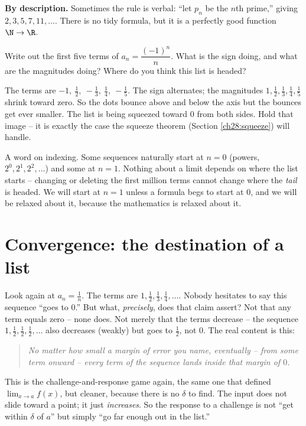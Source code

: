 \textbf{By description.} Sometimes the rule is verbal: ``let $p_n$ be the $n$th
prime,'' giving $2, 3, 5, 7, 11, \dots$. There is no tidy formula, but it is a
perfectly good function $\N \to \R$.

\begin{walkbox}
Write out the first five terms of $a_n = \dfrac{(-1)^n}{n}$. What is the sign
doing, and what are the magnitudes doing? Where do you think this list is
headed?

\smallskip
The terms are $-1,\ \tfrac12,\ -\tfrac13,\ \tfrac14,\ -\tfrac15$. The sign
alternates; the magnitudes $1, \tfrac12, \tfrac13, \tfrac14, \tfrac15$ shrink
toward zero. So the dots bounce above and below the axis but the bounces get
ever smaller. The list is being squeezed toward $0$ from both sides. Hold that
image -- it is exactly the case the squeeze theorem (Section \ref{ch28:squeeze})
will handle.
\end{walkbox}

\begin{marginnotebox}
A word on indexing. Some sequences naturally start at $n=0$ (powers, $2^0,
2^1, 2^2, \dots$) and some at $n=1$. Nothing about a limit depends on where the
list starts -- changing or deleting the first million terms cannot change where
the \emph{tail} is headed. We will start at $n=1$ unless a formula begs to start
at $0$, and we will be relaxed about it, because the mathematics is relaxed about
it.
\end{marginnotebox}

\section{Convergence: the destination of a list}
\label{ch28:convergence}

Look again at $a_n = \tfrac1n$. The terms are $1, \tfrac12, \tfrac13, \tfrac14,
\dots$. Nobody hesitates to say this sequence ``goes to $0$.'' But what,
\emph{precisely}, does that claim assert? Not that any term equals zero -- none
does. Not merely that the terms decrease -- the sequence $1, \tfrac12, \tfrac12,
\tfrac12, \dots$ also decreases (weakly) but goes to $\tfrac12$, not $0$. The
real content is this:

\begin{quote}
\emph{No matter how small a margin of error you name, eventually -- from some
term onward -- every term of the sequence lands inside that margin of $0$.}
\end{quote}

This is the challenge-and-response game again, the same one that defined
$\lim_{x\to a} f(x)$, but cleaner, because there is no $\delta$ to find. The
input does not slide toward a point; it just \emph{increases}. So the response
to a challenge is not ``get within $\delta$ of $a$'' but simply ``go far enough
out in the list.''

